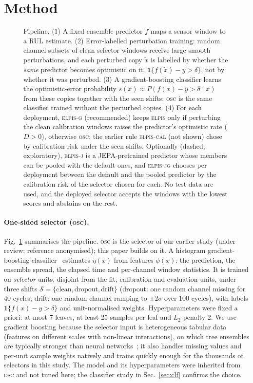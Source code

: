 \documentclass{esannV2}
\newcommand{\OSC}{\textsc{osc}}
\newcommand{\RPT}{\textsc{elpis}}
\newcommand{\AUTO}{\textsc{elpis-cal}}
\newcommand{\AUTOD}{\textsc{elpis-g}}
\newcommand{\EJ}{\textsc{elpis-j}}
\newcommand{\EJG}{\textsc{elpis-jg}}
\begin{document}
\FloatBarrier
\section{Method}\label{sec:method}
\begin{figure}[!htbp]
\centering
\resizebox{\textwidth}{!}{}
\caption{Pipeline. (1) A fixed ensemble predictor $f$ maps a sensor window to a RUL estimate. (2) Error-labelled perturbation training: random channel subsets of clean selector windows receive large smooth perturbations, and each perturbed copy $\tilde x$ is labelled by whether the \emph{same} predictor becomes optimistic on it, $\mathbf 1\{f(\tilde x)-y>\delta\}$, not by whether it was perturbed. (3) A gradient-boosting classifier learns the optimistic-error probability $s(x)\approx P(f(x)-y>\delta\mid x)$ from these copies together with the seen shifts; \OSC{} is the same classifier trained without the perturbed copies. (4) For each deployment, \AUTOD{} (recommended) keeps \RPT{} only if perturbing the clean calibration windows raises the predictor's optimistic rate ($D>0$), otherwise \OSC; the earlier rule \AUTO{} (not shown) chose by calibration risk under the seen shifts. Optionally (dashed, exploratory), \EJ{} is a JEPA-pretrained predictor whose members can be pooled with the default ones, and \EJG{} chooses per deployment between the default and the pooled predictor by the calibration risk of the selector chosen for each. No test data are used, and the deployed selector accepts the windows with the lowest scores and abstains on the rest.}
\label{fig:method}
\end{figure}
\paragraph{One-sided selector (\OSC).} Fig.~\ref{fig:method} summarises the pipeline. \OSC{} is the selector of our earlier study (under review; reference anonymised); this paper builds on it. A histogram gradient-boosting classifier~\cite{pedregosa2011scikit} estimates $\eta(x)$ from features $\phi(x)$: the prediction, the ensemble spread, the elapsed time and per-channel window statistics. It is trained on \emph{selector} units, disjoint from the fit, calibration and evaluation units, under three shifts $\mathcal S=\{\text{clean},\text{dropout},\text{drift}\}$ (dropout: one random channel missing for 40 cycles; drift: one random channel ramping to $\pm2\sigma$ over 100 cycles), with labels $\mathbf 1\{f(x)-y>\delta\}$ and unit-normalised weights. Hyperparameters were fixed a priori: at most 7 leaves, at least 25 samples per leaf and $L_2$ penalty 2. We use gradient boosting because the selector input is heterogeneous tabular data (features on different scales with non-linear interactions), on which tree ensembles are typically stronger than neural networks~\cite{grinsztajn2022tree}; it also handles missing values and per-unit sample weights natively and trains quickly enough for the thousands of selectors in this study. The model and its hyperparameters were inherited from \OSC{} and not tuned here; the classifier study in Sec.~\ref{sec:clf} confirms the choice.
\end{document}

